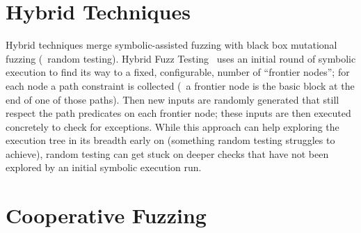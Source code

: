 \section{Hybrid Techniques}
Hybrid techniques merge symbolic-assisted fuzzing with black box mutational
fuzzing (\ie~random testing). Hybrid Fuzz Testing~\cite{pak2012hybrid} uses an
initial round of symbolic execution to find its way to a fixed, configurable,
number of ``frontier nodes''; for each node a path constraint is collected
(\ie~a frontier node is the basic block at the end of one of those paths). Then
new inputs are randomly generated that still respect the path predicates on each
frontier node; these inputs are then executed concretely to check for
exceptions. While this approach can help exploring the execution tree in its
breadth early on (something random testing struggles to achieve), random testing
can get stuck on deeper checks that have not been explored by an initial
symbolic execution run.


\section{Cooperative Fuzzing}


